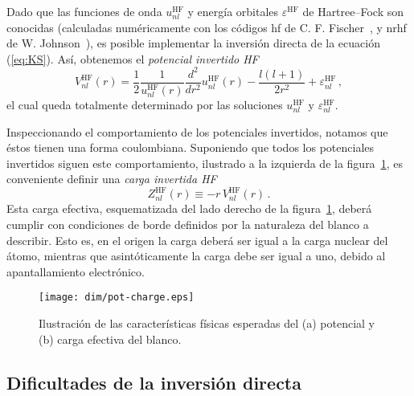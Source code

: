 Dado que las funciones de onda $u_{nl}^{\mathrm{HF}}$ y energía orbitales 
$\varepsilon^{\mathrm{HF}}$ de Hartree--Fock son conocidas (calculadas 
numéricamente con los códigos {\sc hf} de C. F. Fischer~\cite{FroeseFischer:97}, 
y {\sc nrhf} de W. Johnson~\cite{Johnson:07}), es posible implementar 
la inversión directa de la ecuación (\ref{eq:KS}). Así, obtenemos el 
\textit{potencial invertido HF} 
\begin{equation}
V_{nl}^{\mathrm{HF}}(r) = 
\frac{1}{2}\frac{1}{u_{nl}^{\mathrm{HF}}(r)}
\frac{d^2}{dr^{2}}u_{nl}^{\mathrm{HF}}(r) - 
\frac{l(l+1)}{2r^{2}}+\varepsilon _{nl}^{\mathrm{HF}} \,,
\label{eq:VHF}
\end{equation}
el cual queda totalmente determinado por las soluciones 
$u_{nl}^{\mathrm{HF}}$ y $\varepsilon_{nl}^{\mathrm{HF}}$.

Inspeccionando el comportamiento de los potenciales invertidos, notamos 
que éstos tienen una forma coulombiana. Suponiendo que todos los 
potenciales invertidos siguen este comportamiento, ilustrado a la 
izquierda de la figura~\ref{fig:potycharge}, es conveniente definir una 
\textit{carga invertida HF} 
\begin{equation}
Z_{nl}^{\mathrm{HF}}(r) \equiv -r \, V_{nl}^{\mathrm{HF}}(r) \,.
\label{eq:Zeff}
\end{equation}
Esta carga efectiva, esquematizada del lado derecho de la 
figura~\ref{fig:potycharge}, deberá cumplir con condiciones de borde 
definidos por la naturaleza del blanco a describir. Esto es, en el 
origen la carga deberá ser igual a la carga nuclear del átomo, mientras 
que asintóticamente la carga debe ser igual a uno, debido al 
apantallamiento electrónico.

\begin{figure}[t!]
\centering
\texttt{[image: dim/pot-charge.eps]}
\caption[Características físicas del potencial y carga efectiva.]
{Ilustración de las características físicas esperadas del (a) potencial 
y (b) carga efectiva del blanco.}
\label{fig:potycharge}
\end{figure}

\subsection{Dificultades de la inversión directa}
\label{subsec:difnumericasDIM}

